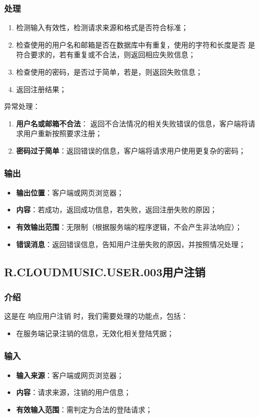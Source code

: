\subsubsection{处理}
	\begin{enumerate}
		\item 检测输入有效性，检测请求来源和格式是否符合标准；
		\item 检查使用的用户名和邮箱是否在数据库中有重复，使用的字符和长度是否
			是符合要求的，若有重复或不合法，则返回相应失败信息；
		\item 检查使用的密码，是否过于简单，若是，则返回失败信息；
		\item 返回注册结果；
	\end{enumerate}
	\noindent 异常处理：
	\begin{enumerate}
		\item \textbf{用户名或邮箱不合法}：
		返回不合法情况的相关失败错误的信息，客户端将请求用户重新按照要求注册；
		\item \textbf{密码过于简单}：返回错误的信息，客户端将请求用户使用更复杂的密码；
	\end{enumerate}
\subsubsection{输出}
\begin{itemize}
	\item \textbf{输出位置}：客户端或网页浏览器；
	\item \textbf{内容}：若成功，返回成功信息，若失败，返回注册失败的原因；
	\item \textbf{有效输出范围}：无限制（根据服务端的程序逻辑，不会产生非法响应）；
	\item \textbf{错误消息}：返回错误信息，告知用户注册失败的原因，并按照情况处理；
\end{itemize}

\subsection{R.CLOUDMUSIC.USER.003用户注销}
\subsubsection{介绍}
	这是在 响应用户注销 时，我们需要处理的功能点，包括：
	\begin{itemize}
		\item 在服务端记录注销的信息，无效化相关登陆凭据；
	\end{itemize}
\subsubsection{输入}
	\begin{itemize}
		\item \textbf{输入来源}：客户端或网页浏览器；
		\item \textbf{内容}：请求来源，注销的用户信息；
		\item \textbf{有效输入范围}：需判定为合法的登陆请求；
	\end{itemize}
